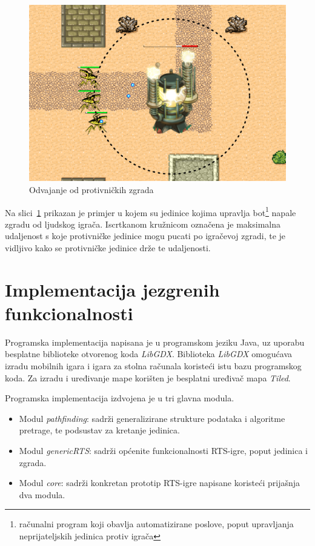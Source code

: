 \documentclass[times, utf8, zavrsni, numeric]{fer}
\begin{document}
\begin{figure}[h]
	\centering
	\includegraphics[width=0.8\linewidth]{images/boidsEnemySeparation.pdf}
	\caption{Odvajanje od protivničkih zgrada}
	\label{fig:boidsEnemySeparation}
\end{figure}

\par Na slici~\ref{fig:boidsEnemySeparation} prikazan je primjer u kojem su jedinice kojima upravlja bot\footnote{računalni program koji obavlja automatizirane poslove, poput upravljanja neprijateljskih jedinica protiv igrača} napale zgradu od ljudskog igrača.
Iscrtkanom kružnicom označena je maksimalna udaljenost s koje protivničke jedinice mogu pucati po igračevoj zgradi, te je vidljivo kako se protivničke jedinice drže te udaljenosti.

\chapter{Implementacija jezgrenih funkcionalnosti}\label{ch:implementation}

\par Programska implementacija napisana je u programskom jeziku Java, uz uporabu besplatne biblioteke otvorenog koda \textit{LibGDX}.
Biblioteka \textit{LibGDX} omogućava izradu mobilnih igara i igara za stolna računala koristeći istu bazu programskog koda. 
Za izradu i uređivanje mape korišten je besplatni uređivač mapa \textit{Tiled}.

\par Programska implementacija izdvojena je u tri glavna modula.
\begin{itemize}
	\item Modul \textit{pathfinding}: sadrži generalizirane strukture podataka i algoritme pretrage, te podsustav za kretanje jedinica.
	\item Modul \textit{genericRTS}: sadrži općenite funkcionalnosti RTS-igre, poput jedinica i zgrada.
	\item Modul \textit{core}: sadrži konkretan prototip RTS-igre napisane koristeći prijašnja dva modula.
\end{itemize}
\end{document}
